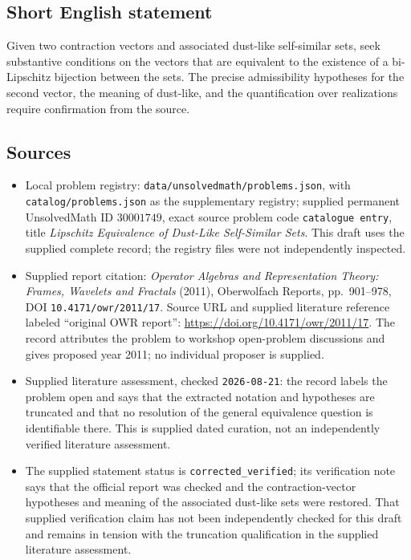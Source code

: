 \documentclass[11pt]{article}
\begin{document}
\subsection{Short English statement}
Given two contraction vectors and associated dust-like self-similar sets, seek substantive conditions on the vectors that are equivalent to the existence of a bi-Lipschitz bijection between the sets. The precise admissibility hypotheses for the second vector, the meaning of dust-like, and the quantification over realizations require confirmation from the source.
\subsection{Sources}
\begin{itemize}
\item Local problem registry: \texttt{data/unsolvedmath/problems.json}, with \texttt{catalog/problems.json} as the supplementary registry; supplied permanent UnsolvedMath ID \(30001749\), exact source problem code \texttt{catalogue entry}, title \emph{Lipschitz Equivalence of Dust-Like Self-Similar Sets}. This draft uses the supplied complete record; the registry files were not independently inspected.
\item Supplied report citation: \emph{Operator Algebras and Representation Theory: Frames, Wavelets and Fractals} (2011), Oberwolfach Reports, pp.~901--978, DOI \texttt{10.4171/owr/2011/17}. Source URL and supplied literature reference labeled ``original OWR report'': \url{https://doi.org/10.4171/owr/2011/17}. The record attributes the problem to workshop open-problem discussions and gives proposed year 2011; no individual proposer is supplied.
\item Supplied literature assessment, checked \texttt{2026-08-21}: the record labels the problem open and says that the extracted notation and hypotheses are truncated and that no resolution of the general equivalence question is identifiable there. This is supplied dated curation, not an independently verified literature assessment.
\item The supplied statement status is \texttt{corrected\_verified}; its verification note says that the official report was checked and the contraction-vector hypotheses and meaning of the associated dust-like sets were restored. That supplied verification claim has not been independently checked for this draft and remains in tension with the truncation qualification in the supplied literature assessment.
\end{itemize}
\end{document}
